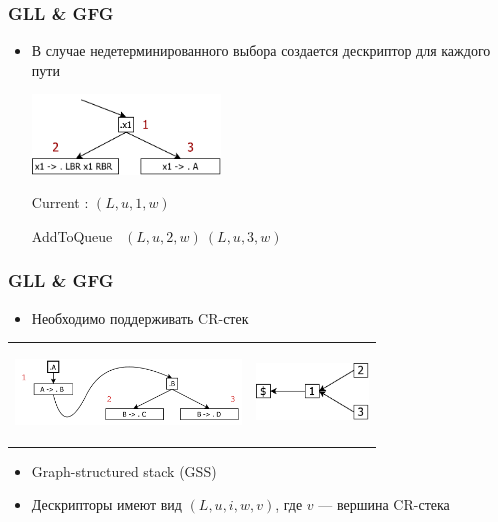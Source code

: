 \documentclass{beamer}
\begin{document}
\begin{frame}
	\transwipe[direction=90]
	\frametitle{GLL \& GFG}
	\begin{itemize}
		\item В случае недетерминированного выбора создается дескриптор для каждого пути
			\begin{center}
				\includegraphics[width=5cm]{pictures/fork.pdf}
				\vspace{10pt}
				
				Current : $(L, u, 1, w)$
				
				AddToQueue \ $(L, u, 2, w) \ (L, u, 3, w)$
			\end{center}
	\end{itemize}
\end{frame}

\begin{frame}
	\transwipe[direction=90]
	\frametitle{GLL \& GFG}
	\begin{itemize}
		\item Необходимо поддерживать CR-стек		
	\end{itemize}
	\begin{table}
	\centering
		\begin{tabular}{p{6cm} p{4cm}}
			\begin{center}
				\includegraphics[width=6cm]{pictures/stack_fork.pdf}
			\end{center}
			&
			\begin{center}
				\includegraphics[width=3cm]{pictures/CR_gss.pdf}
			\end{center}
		\end{tabular}
	\end{table}
	\begin{itemize}
		\item Graph-structured stack (GSS)
		\item Дескрипторы имеют вид $(L, u, i, w, v)$, где $v$ --- вершина CR-стека
	\end{itemize}
\end{frame}
\end{document}
